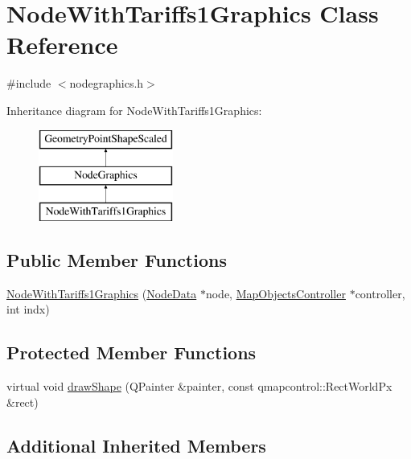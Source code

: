 \hypertarget{class_node_with_tariffs1_graphics}{}\section{Node\+With\+Tariffs1\+Graphics Class Reference}
\label{class_node_with_tariffs1_graphics}


{\ttfamily \#include $<$nodegraphics.\+h$>$}

Inheritance diagram for Node\+With\+Tariffs1\+Graphics\+:\begin{figure}[H]
\begin{center}
\leavevmode
\includegraphics[height=3.000000cm]{db/d35/class_node_with_tariffs1_graphics}
\end{center}
\end{figure}
\subsection*{Public Member Functions}
\begin{DoxyCompactItemize}
\item 
\mbox{\hyperlink{class_node_with_tariffs1_graphics_a7e817e64905f4977607d2a2e19e7c739}{Node\+With\+Tariffs1\+Graphics}} (\mbox{\hyperlink{class_node_data}{Node\+Data}} $\ast$node, \mbox{\hyperlink{class_map_objects_controller}{Map\+Objects\+Controller}} $\ast$controller, int indx)
\end{DoxyCompactItemize}
\subsection*{Protected Member Functions}
\begin{DoxyCompactItemize}
\item 
virtual void \mbox{\hyperlink{class_node_with_tariffs1_graphics_a886b4a82beee822a46877b72d7dd3f6e}{draw\+Shape}} (Q\+Painter \&painter, const qmapcontrol\+::\+Rect\+World\+Px \&rect)
\end{DoxyCompactItemize}
\subsection*{Additional Inherited Members}


